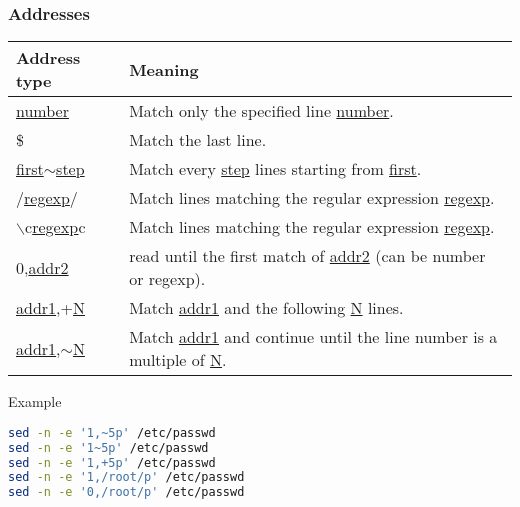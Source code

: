 \documentclass[red]{beamer}
\begin{document}
\begin{CJK*}{UTF8}{gbsn}
\begin{frame}
\frametitle{Addresses}
\begin{table}[ht]
\scriptsize
\renewcommand\arraystretch{1.6}
\begin{tabular}{ll}
\hline
\textbf{Address type} & \textbf{Meaning}\\
\hline
\underline{number} & Match only the specified line \underline{number}.\\
\$ & Match the last line.\\
\underline{first}$\sim$\underline{step} & Match every \underline{step} lines starting from \underline{first}.\\
/\underline{regexp}/ & Match lines matching the regular expression \underline{regexp}.\\
$\backslash$c\underline{regexp}c & Match lines matching the regular expression \underline{regexp}.\\
0,\underline{addr2} & read until the first match of \underline{addr2} (can be number or regexp).\\
\underline{addr1},+\underline{N} & Match \underline{addr1} and the following \underline{N} lines.\\
\underline{addr1},$\sim$\underline{N} & Match \underline{addr1} and continue until the line number is a multiple of \underline{N}.\\
\hline
\end{tabular}
\end{table}
\begin{block}{\centering\scriptsize Example}
\begin{lstlisting}[language=bash]
sed -n -e '1,~5p' /etc/passwd
sed -n -e '1~5p' /etc/passwd
sed -n -e '1,+5p' /etc/passwd
sed -n -e '1,/root/p' /etc/passwd
sed -n -e '0,/root/p' /etc/passwd
\end{lstlisting}
\end{block}
\end{frame}


\end{CJK*}
\end{document}
